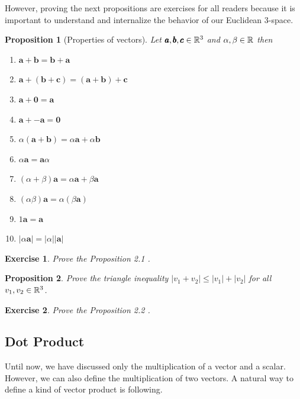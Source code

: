 \documentclass[12pt]{article}
\newtheorem{proposition}{Proposition}[section]
\newtheorem{exercise}{Exercise}[section]
\begin{document}
However, proving the next propositions are exercises for all readers because it is important to
understand and internalize the behavior of our Euclidean 3-space.

\begin{proposition}[Properties of vectors]
  Let $\pmb{a}, \pmb{b}, \pmb{c} \in \mathbb{R}^3$ and $\alpha, \beta \in \mathbb{R}$ then
  \begin{enumerate}
    \item $\pmb{a} + \pmb{b} = \pmb{b} + \pmb{a}$
    \item $\pmb{a} + (\pmb{b} + \pmb{c}) = (\pmb{a} + \pmb{b}) + \pmb{c}$
    \item $\pmb{a} + \pmb{0} = \pmb{a}$
    \item $\pmb{a} + \pmb{-a} = \pmb{0}$
    \item $\alpha(\pmb{a} + \pmb{b}) = \alpha \pmb{a} + \alpha \pmb{b}$
    \item $\alpha \pmb{a} = \pmb{a} \alpha$
    \item $(\alpha + \beta) \pmb{a} = \alpha \pmb{a} + \beta \pmb{a}$
    \item $(\alpha\beta)\pmb{a} = \alpha(\beta \pmb{a})$
    \item $1\pmb{a} = \pmb{a}$
    \item $|\alpha \pmb{a}| = |\alpha| | \pmb{a} |$
  \end{enumerate}
\end{proposition}

\begin{exercise}
  Prove the Proposition 2.1 .
\end{exercise}

\begin{proposition}
  Prove the triangle inequality $|v_1 + v_2| \leq |v_1| + |v_2|$ for all $v_1, v_2 \in \mathbb{R}^3$.
\end{proposition}

\begin{exercise}
  Prove the Proposition 2.2 .
\end{exercise}

\subsection{Dot Product}

Until now, we have discussed only the multiplication of a vector and a scalar. However,
we can also define the multiplication of two vectors. A natural way to define a kind of vector product
is following.
\end{document}
